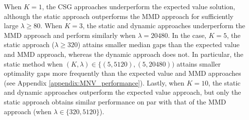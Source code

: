 When $K = 1$, the CSG approaches underperform the expected value solution, although the static approach outperforms the MMD approach for sufficiently large $\lambda \geq 80$. When $K = 3$, the static and dynamic approaches underperform the MMD approach and perform similarly when $\lambda = 20480$. In the case, $K = 5$, the static approach ($\lambda \geq 320$) attains smaller median gaps than the expected value and MMD approach, whereas the dynamic approach does not. In particular, the static method when $(K, \lambda) \in \{(5, 5120), (5, 20480))$ attains smaller optimality gaps more frequently than the expected value and MMD approaches (see Appendix \ref{appendix:MNV_performance}). Lastly, when $K = 10$, the static and dynamic approaches outperform the expected value approach, but only the static approach obtains similar performance on par with that of the MMD approach (when $\lambda \in \{320, 5120\}$).


